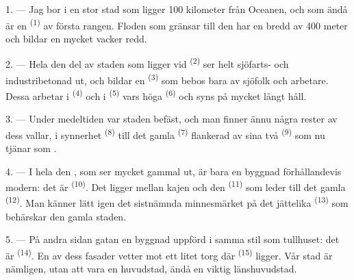 
\VUsaut{2.0mm}
\VUsaut{3.0mm}
\VUfilet{16mm}
\VUsaut{5.6mm}
\VUsaut{1.4mm}
\VUsaut{2.2mm}

\VUsaut{3.0mm}

1. --- Jag bor i en stor stad som ligger 100 kilometer från Oceanen, och som ändå är en
 \textsuperscript{(1)} av första rangen. Floden som gränsar till den har en bredd
av 400 meter och bildar en mycket vacker redd.

2. --- Hela den del av staden som ligger vid  \textsuperscript{(2)} ser helt
sjöfarts- och industribetonad ut, och bildar en
 \textsuperscript{(3)} som bebos bara av sjöfolk och arbetare.
Dessa arbetar i  \textsuperscript{(4)} och i
 \textsuperscript{(5)} vars höga 
\textsuperscript{(6)} och  syns på mycket långt håll.

3. --- Under medeltiden var staden befäst, och man finner ännu några rester av dess vallar, i
synnerhet  \textsuperscript{(8)} till det gamla
 \textsuperscript{(7)} flankerad av sina två
 \textsuperscript{(9)} som nu tjänar som .

4. --- I hela den , som ser mycket gammal ut, är bara en byggnad
förhållandevis modern: det är  \textsuperscript{(10)}. Det ligger mellan
kajen och den  \textsuperscript{(11)} som leder till det gamla
 \textsuperscript{(12)}. Man känner lätt igen det sistnämnda minnesmärket på
det jättelika  \textsuperscript{(13)} som behärskar den gamla staden.

5. --- På andra sidan gatan  en byggnad uppförd i samma stil som tullhuset: det
är  \textsuperscript{(14)}. En av dess fasader vetter mot ett litet torg där
 \textsuperscript{(15)} ligger. Vår stad är nämligen, utan att vara en
huvudstad, ändå en viktig länshuvudstad.


